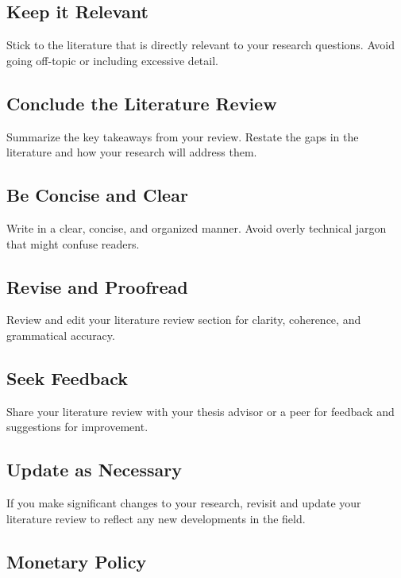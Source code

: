 \documentclass[../thesis.tex]{subfiles}
\begin{document}
	\begin{tcolorbox}[colback=red!5!white,colframe=red!75!black]
	
	\subsection{Keep it Relevant}
	Stick to the literature that is directly relevant to your research questions. Avoid going off-topic or including excessive detail.
	
	\subsection{Conclude the Literature Review}
	Summarize the key takeaways from your review. Restate the gaps in the literature and how your research will address them.
	
	\subsection{Be Concise and Clear}
	Write in a clear, concise, and organized manner. Avoid overly technical jargon that might confuse readers.
	
	\subsection{Revise and Proofread}
	Review and edit your literature review section for clarity, coherence, and grammatical accuracy.
	
	\subsection{Seek Feedback}
	Share your literature review with your thesis advisor or a peer for feedback and suggestions for improvement.
	
	\subsection{Update as Necessary}
	If you make significant changes to your research, revisit and update your literature review to reflect any new developments in the field.
	
	\end{tcolorbox}
	
	\newpage
	
	\subsection*{Monetary Policy}
	
\end{document}
